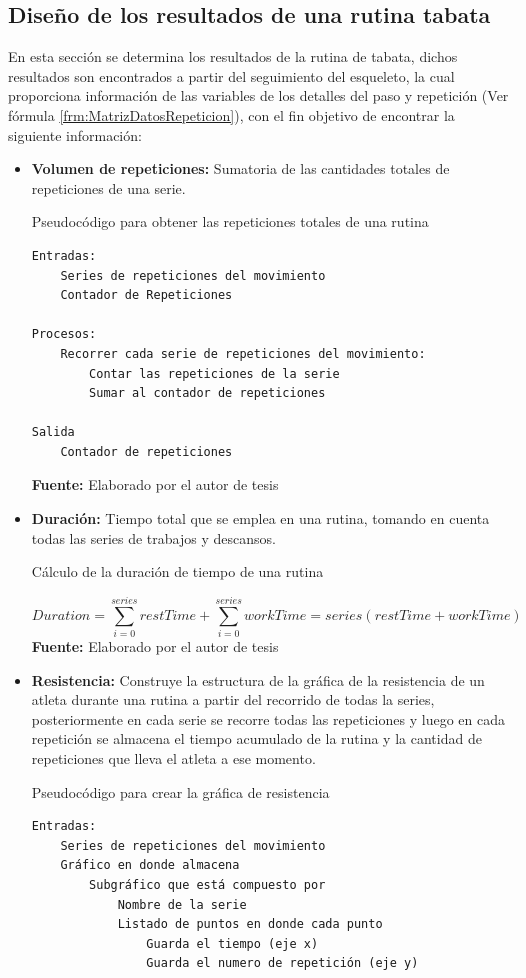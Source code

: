 \subsection{Dise\~no de los resultados de una rutina tabata} \label{dis:results}
En esta secci\'on se determina los resultados de la rutina de tabata, dichos resultados son encontrados a partir del seguimiento del esqueleto, la cual proporciona informaci\'on de las variables de los detalles del paso y repetici\'on (Ver f\'ormula \ref{frm:MatrizDatosRepeticion}), con el fin objetivo de encontrar la siguiente informaci\'on:
\begin{itemize}
\item \textbf{Volumen de repeticiones:} Sumatoria de las cantidades totales de repeticiones de una serie.  
\begin{code}[H]
	\caption{Pseudoc\'odigo para obtener las repeticiones totales de una rutina}
	\label{code:getRepetitions}
	\begin{lstlisting}
Entradas:
	Series de repeticiones del movimiento
	Contador de Repeticiones

Procesos:
	Recorrer cada serie de repeticiones del movimiento:
		Contar las repeticiones de la serie
		Sumar al contador de repeticiones

Salida
	Contador de repeticiones
	\end{lstlisting}
	\textbf{Fuente:} Elaborado por el autor de tesis
\end{code}

\item \textbf{Duraci\'on:} Tiempo total que se emplea en una rutina, tomando en cuenta todas las series de trabajos y descansos.
\begin{formula}[H]
	\centering
	\caption{C\'alculo de la duraci\'on de tiempo de una rutina}
	\label{eq:DurationTime}
	\begin{equation}
	Duration = \sum_{i=0}^{series}restTime +\sum_{i=0}^{series}workTime = series(restTime+workTime)
	\end{equation}
		\textbf{Fuente:} Elaborado por el autor de tesis
\end{formula}
\item \textbf{Resistencia:} Construye la estructura de la gr\'afica de la resistencia de un atleta durante una rutina a partir del recorrido de todas la series, posteriormente en cada serie se recorre todas las repeticiones y luego en cada repetici\'on se almacena el tiempo acumulado de la rutina y la cantidad de repeticiones que lleva el atleta a ese momento.
\begin{code}[H]
	\caption{Pseudoc\'odigo para crear la gr\'afica de resistencia}
	\label{code:getEndurance}
	\begin{lstlisting}
Entradas:
	Series de repeticiones del movimiento
	Gráfico en donde almacena
		Subgráfico que está compuesto por
			Nombre de la serie
			Listado de puntos en donde cada punto
				Guarda el tiempo (eje x)
				Guarda el numero de repetición (eje y)
	

\end{lstlisting}
\end{code}
\end{itemize}
